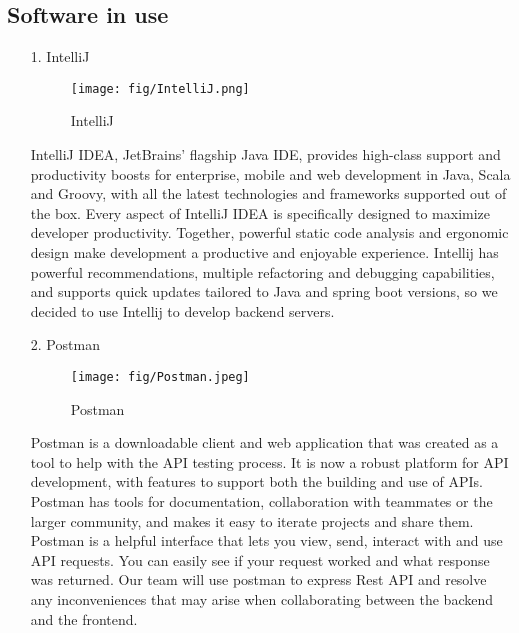\documentclass[conference]{IEEEtran}
\begin{document}
\subsection{Software in use}
\begin{enumerate}

    \item[1.]IntelliJ \cite{intellij2011most}
    \begin{figure}[h]
    \centering
    \texttt{[image: fig/IntelliJ.png]}
    \label{fig:IntelliJ}
    \caption{IntelliJ} 
    \end{figure} 
    \item[]IntelliJ IDEA, JetBrains’ flagship Java IDE, provides high-class support and productivity boosts for enterprise, mobile and web development in Java, Scala and Groovy, with all the latest technologies and frameworks supported out of the box. Every aspect of IntelliJ IDEA is specifically designed to maximize developer productivity. Together, powerful static code analysis and ergonomic design make development a productive and enjoyable experience. Intellij has powerful recommendations, multiple refactoring and debugging capabilities, and supports quick updates tailored to Java and spring boot versions, so we decided to use Intellij to develop backend servers.\\

    \item[2.]Postman \cite{hyams2022you}
    \begin{figure}[h]
    \centering
    \texttt{[image: fig/Postman.jpeg]}
    \label{fig:Postman}
    \caption{Postman} 
    \end{figure}
    \item[]Postman is a downloadable client and web application that was created as a tool to help with the API testing process. It is now a robust platform for API development, with features to support both the building and use of APIs. Postman has tools for documentation, collaboration with teammates or the larger community, and makes it easy to iterate projects and share them. Postman is a helpful interface that lets you view, send, interact with and use API requests. You can easily see if your request worked and what response was returned. Our team will use postman to express Rest API and resolve any inconveniences that may arise when collaborating between the backend and the frontend.\\ 


\end{enumerate}
\end{document}
